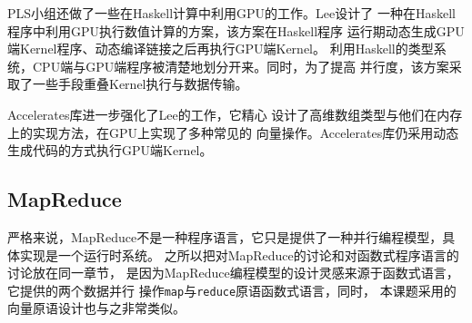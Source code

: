 PLS小组还做了一些在Haskell计算中利用GPU的工作。Lee设计了
一种在Haskell程序中利用GPU执行数值计算的方案，该方案在Haskell程序
运行期动态生成GPU端Kernel程序、动态编译链接之后再执行GPU端Kernel。
利用Haskell的类型系统，CPU端与GPU端程序被清楚地划分开来。同时，为了提高
并行度，该方案采取了一些手段重叠Kernel执行与数据传输。

Accelerates库进一步强化了Lee的工作，它精心
设计了高维数组类型与他们在内存上的实现方法，在GPU上实现了多种常见的
向量操作。Accelerates库仍采用动态生成代码的方式执行GPU端Kernel。


\subsection{MapReduce}
严格来说，MapReduce不是一种程序语言，它只是提供了一种并行编程模型，具体实现是一个运行时系统。
之所以把对MapReduce的讨论和对函数式程序语言的讨论放在同一章节，
是因为MapReduce编程模型的设计灵感来源于函数式语言，它提供的两个数据并行
操作\texttt{map}与\texttt{reduce}原语函数式语言，同时，
本课题采用的向量原语设计也与之非常类似。

